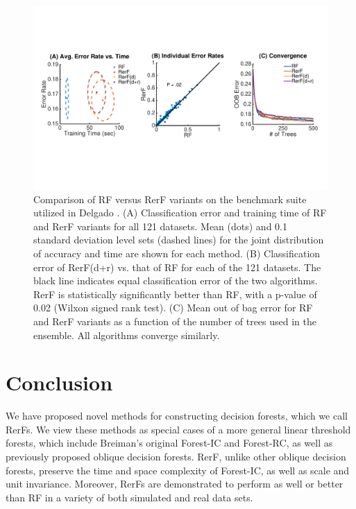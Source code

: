 \documentclass{article} %
\begin{document}
\begin{figure}[h]
\begin{center}
\includegraphics[trim=0in 3.1in 0in 2.9in, clip=true, width=\linewidth]{../Figures/pdf/Fig4_v2}
\end{center}
\caption{Comparison of RF versus RerF variants on the benchmark suite utilized in Delgado \cite{Delgado2014}. (A) Classification error and training time of RF and RerF variants for all 121 datasets. Mean (dots) and 0.1 standard deviation level sets (dashed lines) for the joint distribution of accuracy and time are shown for each method. (B) Classification error of RerF(d+r) vs. that of RF for each of the 121 datasets. The black line indicates equal classification error of the two algorithms.  RerF is statistically significantly better than RF, with a p-value of 0.02 (Wilxon signed rank test). (C) Mean out of bag error for RF and RerF variants as a function of the number of trees used in the ensemble. All algorithms converge similarly.}
\label{fig:benchmark}
\end{figure}


\section{Conclusion}

We have proposed novel methods for constructing decision forests, which we call RerFs. We view these methods as special cases of a more general linear threshold forests, which include Breiman's original Forest-IC and Forest-RC, as well as previously proposed oblique decision forests. RerF, unlike other oblique decision forests, preserve the time and space complexity of Forest-IC, as well as scale and unit invariance.  Moreover, RerFs are demonstrated to perform as well or better than RF in a variety of both simulated and real data sets. 
\end{document}
